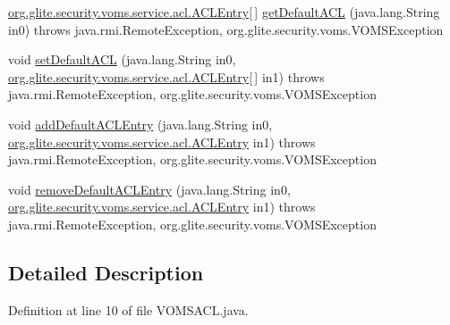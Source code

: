 \begin{DoxyCompactItemize}
\hyperlink{classorg_1_1glite_1_1security_1_1voms_1_1service_1_1acl_1_1ACLEntry}{org.glite.security.voms.service.acl.ACLEntry}\mbox{[}$\,$\mbox{]} \hyperlink{interfaceorg_1_1glite_1_1security_1_1voms_1_1service_1_1acl_1_1VOMSACL_a36a79f9b945097c3272caf45ee6c00c5}{getDefaultACL} (java.lang.String in0)  throws java.rmi.RemoteException, org.glite.security.voms.VOMSException
\item 
void \hyperlink{interfaceorg_1_1glite_1_1security_1_1voms_1_1service_1_1acl_1_1VOMSACL_a74de4a5ebe11f2f04c1368e650324251}{setDefaultACL} (java.lang.String in0, \hyperlink{classorg_1_1glite_1_1security_1_1voms_1_1service_1_1acl_1_1ACLEntry}{org.glite.security.voms.service.acl.ACLEntry}\mbox{[}$\,$\mbox{]} in1)  throws java.rmi.RemoteException, org.glite.security.voms.VOMSException
\item 
void \hyperlink{interfaceorg_1_1glite_1_1security_1_1voms_1_1service_1_1acl_1_1VOMSACL_aa8578190311d5a23d39f28e03815d401}{addDefaultACLEntry} (java.lang.String in0, \hyperlink{classorg_1_1glite_1_1security_1_1voms_1_1service_1_1acl_1_1ACLEntry}{org.glite.security.voms.service.acl.ACLEntry} in1)  throws java.rmi.RemoteException, org.glite.security.voms.VOMSException
\item 
void \hyperlink{interfaceorg_1_1glite_1_1security_1_1voms_1_1service_1_1acl_1_1VOMSACL_a1763b2cfe2b651207f6f5202d094731c}{removeDefaultACLEntry} (java.lang.String in0, \hyperlink{classorg_1_1glite_1_1security_1_1voms_1_1service_1_1acl_1_1ACLEntry}{org.glite.security.voms.service.acl.ACLEntry} in1)  throws java.rmi.RemoteException, org.glite.security.voms.VOMSException
\end{DoxyCompactItemize}


\subsection{Detailed Description}


Definition at line 10 of file VOMSACL.java.



